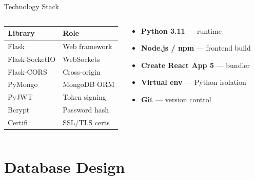 \documentclass[aspectratio=169,12pt]{beamer}
\begin{document}
\begin{frame}{Technology Stack}
\begin{columns}[t]
\begin{tcolorbox}[colback=BPDark!8,colframe=BPDark,arc=6pt,
  title={\faServer\ \textbf{Backend}},
  fonttitle=\bfseries\color{white},
  attach boxed title to top left={yshift=-2mm,xshift=4mm},
  boxed title style={colback=BPDark}]
\small
\begin{tabular}{@{}p{}p{}@{}}
  \toprule
  \textbf{Library} & \textbf{Role} \\
  \midrule
  Flask           & Web framework \\
  Flask-SocketIO  & WebSockets    \\
  Flask-CORS      & Cross-origin  \\
  PyMongo         & MongoDB ORM   \\
  PyJWT           & Token signing \\
  Bcrypt          & Password hash \\
  Certifi         & SSL/TLS certs \\
  \bottomrule
\end{tabular}
\end{tcolorbox}

\vspace{6pt}
\begin{tcolorbox}[colback=AccentBlue!8,colframe=AccentBlue,arc=6pt,
  title={\faCogs\ \textbf{Infrastructure \& Tooling}},
  fonttitle=\bfseries\color{white},
  attach boxed title to top left={yshift=-2mm,xshift=4mm},
  boxed title style={colback=AccentBlue}]
\small
\begin{itemize}\setlength\itemsep{3pt}
  \item \textbf{Python 3.11} --- runtime
  \item \textbf{Node.js / npm} --- frontend build
  \item \textbf{Create React App 5} --- bundler
  \item \textbf{Virtual env} --- Python isolation
  \item \textbf{Git} --- version control
\end{itemize}
\end{tcolorbox}
\end{columns}
\end{frame}

\section{Database Design}
\end{document}
